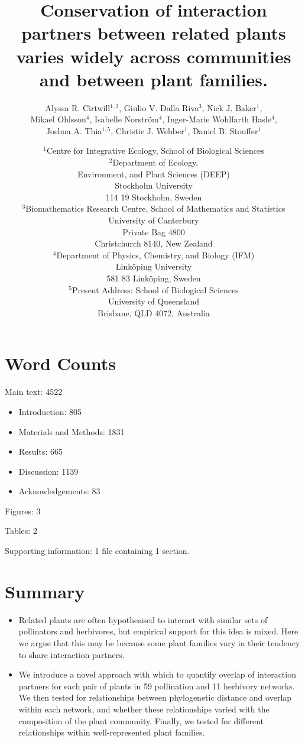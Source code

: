 \documentclass[12pt]{article}
\title{Conservation of interaction partners between related plants varies widely across communities and between plant families.}
\author{Alyssa R. Cirtwill$^{1,2}$, Giulio V. Dalla Riva$^{3}$, Nick J. Baker$^{1}$,\\
Mikael Ohlsson$^{4}$, Isabelle Norstr\"{o}m$^{4}$, Inger-Marie Wohlfarth Hasle$^{4}$,\\
Joshua A. Thia$^{1,5}$, Christie J. Webber$^{1}$, Daniel B. Stouffer$^{1}$}
\date{\small$^1$Centre for Integrative Ecology, School of Biological Sciences\\
\medskip$^2$Department of Ecology,\\
Environment, and Plant Sciences (DEEP)\\
Stockholm University\\
114 19 Stockholm, Sweden\\
\medskip$^3$Biomathematics Research Centre, School of Mathematics and Statistics\\
University of Canterbury\\Private Bag 4800\\
Christchurch 8140, New Zealand\\
\medskip$^4$Department of Physics, Chemistry, and Biology (IFM)\\ Link\"{o}ping University\\ 581 83 Link\"{o}ping, Sweden\\
\medskip$^5$Present Address: School of Biological Sciences\\
University of Queensland\\Brisbane, QLD 4072, Australia }
\begin{document}
\maketitle
\baselineskip=8.5mm
\begin{spacing}{1.0}

\section*{Word Counts}

Main text: 4522

\begin{itemize}
  \item Introduction: 805 
  \item Materials and Methods: 1831 
  \item Results: 665
  \item Discussion: 1139 
  \item Acknowledgements: 83
\end{itemize}



Figures: 3


Tables: 2


Supporting information: 1 file containing 1 section.


\vspace{0.4 in}

\section*{Summary}

  \begin{itemize}
    \item Related plants are often hypothesised to interact with similar sets of 
          pollinators and herbivores, but empirical support for this idea is mixed.
          Here we argue that this may be because some plant families vary in their 
          tendency to share interaction partners.

    \item We introduce a novel approach with which to quantify
          overlap of interaction
          partners for each pair of plants in 59 pollination and 11 herbivory
          networks.  We then tested for relationships between phylogenetic 
          distance and overlap within each network, and whether these 
          relationships varied with the composition of the plant community.
          Finally, we tested for different relationships within well-represented
          plant families.


\end{itemize}
\end{spacing}
\end{document}
